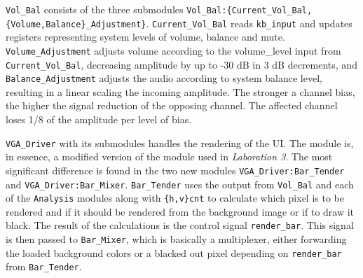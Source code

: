 \texttt{Vol\_Bal} consists of the three submodules \verb=Vol_Bal:{Current_Vol_Bal,{Volume,Balance}_Adjustment}=. \verb=Current_Vol_Bal= reads \verb=kb_input= and updates registers representing system levels of volume, balance and mute.
\verb=Volume_Adjustment= adjusts volume according to the volume\_level input from \verb=Current_Vol_Bal=, decreasing amplitude by up to -30 dB in 3 dB decrements, and \verb=Balance_Adjustment= adjusts the audio according to system balance level, resulting in a linear scaling the incoming amplitude. The stronger a channel bias, the higher the signal reduction of the opposing channel. The affected channel loses 1/8 of the amplitude per level of bias.

\texttt{VGA\_Driver} with its submodules handles the rendering of the UI. The module is, in essence, a modified version of the module used in \emph{Laboration 3}. The most significant difference is found in the two new modules \verb=VGA_Driver:Bar_Tender= and \verb=VGA_Driver:Bar_Mixer=. \verb=Bar_Tender= uses the output from \verb=Vol_Bal= and each of the \verb=Analysis= modules along with \verb={h,v}cnt= to calculate which pixel is to be rendered and if it should be rendered from the background image or if to draw it black. The result of the calculations is the control signal \verb=render_bar=. This signal is then passed to \verb=Bar_Mixer=, which is basically a multiplexer, either forwarding the loaded background colors or a blacked out pixel depending on \verb=render_bar= from \verb=Bar_Tender=.
